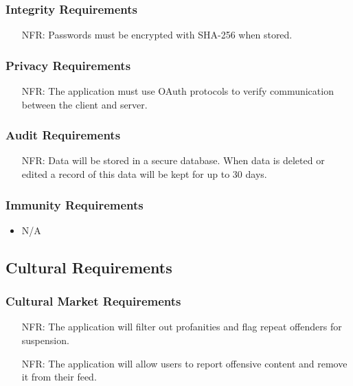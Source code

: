 \documentclass[12pt]{article}
\newcounter{nfrnum} %
\begin{document}
  \subsubsection{Integrity Requirements}
    \noindent \begin{itemize}
      \item[NFR\refstepcounter{nfrnum}\thenfrnum:]
       Passwords must be encrypted with SHA-256 when stored.
    \end{itemize}

  \subsubsection{Privacy Requirements}
    \noindent \begin{itemize}
      \item[NFR\refstepcounter{nfrnum}\thenfrnum:]
        The application must use OAuth protocols to verify communication between the client and server.
    \end{itemize}

  \subsubsection{Audit Requirements}
    \noindent \begin{itemize}
      \item[NFR\refstepcounter{nfrnum}\thenfrnum:]
        Data will be stored in a secure database. When data is deleted or edited a record of this data will be kept for up to 30 days.
    \end{itemize}
  \subsubsection{Immunity Requirements}
    \noindent \begin{itemize}
      \item N/A
    \end{itemize}



\subsection{Cultural Requirements}
  \subsubsection{Cultural Market Requirements}
    \noindent \begin{itemize}
      \item[NFR\refstepcounter{nfrnum}\thenfrnum:]
        The application will filter out profanities and flag repeat offenders for suspension.
      \item[NFR\refstepcounter{nfrnum}\thenfrnum:]
        The application will allow users to report offensive content and remove it from their feed.
    \end{itemize}
\end{document}
